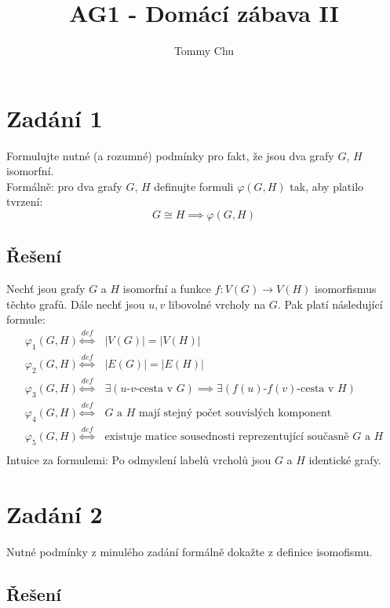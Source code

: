 \documentclass{article}
\title{AG1 - Domácí zábava II}
\author{Tommy Chu}
\date{}
\begin{document}
\maketitle

\section*{Zadání 1}

Formulujte nutné (a rozumné) podmínky pro fakt, že jsou dva grafy $G$, $H$ isomorfní. \\
Formálně: pro dva grafy $G$, $H$ definujte formuli $\varphi(G, H)$ tak, aby platilo tvrzení: \[ G \cong H \implies \varphi(G, H) \]

\subsection*{Řešení}

Nechť jsou grafy $G$ a $H$ isomorfní a funkce $f \colon V(G) \rightarrow V(H)$ isomorfismus těchto grafů. Dále nechť jsou $u, v$ libovolné vrcholy na $G$. Pak platí následující formule:
\begin{align*}
    \varphi_1(G, H) \overset{def}{\iff} & \lvert V(G) \rvert = \lvert V(H) \rvert                                                  \\
    \varphi_2(G, H) \overset{def}{\iff} & \lvert E(G) \rvert = \lvert E(H) \rvert                                                  \\
    \varphi_3(G, H) \overset{def}{\iff} & \exists (\text{$u$-$v$-cesta v $G$}) \implies \exists (\text{$f(u)$-$f(v)$-cesta v $H$}) \\
    \varphi_4(G, H) \overset{def}{\iff} & \text{$G$ a $H$ mají stejný počet souvislých komponent}                                  \\
    \varphi_5(G, H) \overset{def}{\iff} & \text{existuje matice sousednosti reprezentující současně $G$ a $H$}                     \\
\end{align*}
Intuice za formulemi: Po odmyslení labelů vrcholů jsou $G$ a $H$ identické grafy.

\newpage
\section*{Zadání 2}

Nutné podmínky z minulého zadání formálně dokažte z definice isomofismu.

\subsection*{Řešení}
\end{document}
